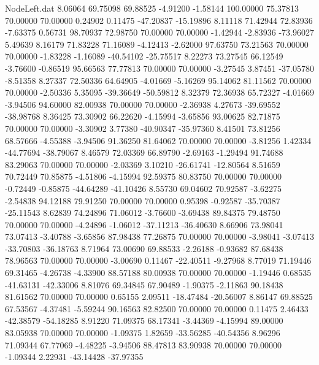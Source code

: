 \begin{filecontents}{NodeLeft.dat}
   8.06064   69.75098   69.88525    -4.91200   -1.58144  100.00000   75.37813   70.00000   70.00000    0.24902    0.11475  -47.20837  -15.19896
   8.11118   71.42944   72.83936    -7.63375    0.56731   98.70937   72.98750   70.00000   70.00000   -1.42944   -2.83936  -73.96027    5.49639
   8.16179   71.83228   71.16089    -4.12413   -2.62000   97.63750   73.21563   70.00000   70.00000   -1.83228   -1.16089  -40.54102  -25.75517
   8.22273   73.27545   66.12549    -3.76600   -0.86519   95.66563   77.77813   70.00000   70.00000   -3.27545    3.87451  -37.05780   -8.51358
   8.27337   72.50336   64.64905    -4.01669   -5.16269   95.14062   81.11562   70.00000   70.00000   -2.50336    5.35095  -39.36649  -50.59812
   8.32379   72.36938   65.72327    -4.01669   -3.94506   94.60000   82.00938   70.00000   70.00000   -2.36938    4.27673  -39.69552  -38.98768
   8.36425   73.30902   66.22620    -4.15994   -3.65856   93.00625   82.71875   70.00000   70.00000   -3.30902    3.77380  -40.90347  -35.97360
   8.41501   73.81256   68.57666    -4.55388   -3.94506   91.36250   81.64062   70.00000   70.00000   -3.81256    1.42334  -44.77694  -38.79067
   8.46579   72.03369   66.89790    -2.69163   -1.29494   91.74688   83.29063   70.00000   70.00000   -2.03369    3.10210  -26.61741  -12.80564
   8.51659   70.72449   70.85875    -4.51806   -4.15994   92.59375   80.83750   70.00000   70.00000   -0.72449   -0.85875  -44.64289  -41.10426
   8.55730   69.04602   70.92587    -3.62275   -2.54838   94.12188   79.91250   70.00000   70.00000    0.95398   -0.92587  -35.70387  -25.11543
   8.62839   74.24896   71.06012    -3.76600   -3.69438   89.84375   79.48750   70.00000   70.00000   -4.24896   -1.06012  -37.11213  -36.40630
   8.66906   73.98041   73.07413    -3.40788   -3.65856   87.98438   77.26875   70.00000   70.00000   -3.98041   -3.07413  -33.70803  -36.18763
   8.71964   73.00690   69.88533    -2.26188   -0.93682   87.68438   78.96563   70.00000   70.00000   -3.00690    0.11467  -22.40511   -9.27968
   8.77019   71.19446   69.31465    -4.26738   -4.33900   88.57188   80.00938   70.00000   70.00000   -1.19446    0.68535  -41.63131  -42.33006
   8.81076   69.34845   67.90489    -1.90375   -2.11863   90.18438   81.61562   70.00000   70.00000    0.65155    2.09511  -18.47484  -20.56007
   8.86147   69.88525   67.53567    -4.37481   -5.59244   90.16563   82.82500   70.00000   70.00000    0.11475    2.46433  -42.38579  -54.18285
   8.91220   71.09375   68.17341    -3.44369   -4.15994   89.00000   83.05938   70.00000   70.00000   -1.09375    1.82659  -33.56285  -40.54356
   8.96296   71.09344   67.77069    -4.48225   -3.94506   88.47813   83.90938   70.00000   70.00000   -1.09344    2.22931  -43.14428  -37.97355

\end{filecontents}
